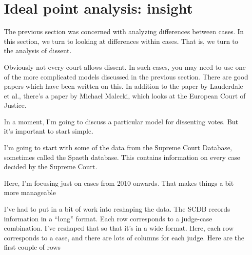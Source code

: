 \documentclass[12pt,twoside]{article}
\begin{document}
\section{Ideal point analysis:
insight}\label{ideal-point-analysis-insight}

The previous section was concerned with analyzing differences between
cases. In this section, we turn to looking at differences within cases.
That is, we turn to the analysis of dissent.

Obviously not every court allows dissent. In such cases, you may need to
use one of the more complicated models discussed in the previous
section. There are good papers which have been written on this. In
addition to the paper by Lauderdale et al., there's a paper by Michael
Malecki, which looks at the European Court of Justice.

In a moment, I'm going to discuss a particular model for dissenting
votes. But it's important to start simple.

I'm going to start with some of the data from the Supreme Court
Database, sometimes called the Spaeth database. This contains
information on every case decided by the Supreme Court.

Here, I'm focusing just on cases from 2010 onwards. That makes things a
bit more manageable

I've had to put in a bit of work into reshaping the data. The SCDB
records information in a ``long'' format. Each row corresponds to a
judge-case combination. I've reshaped that so that it's in a wide
format. Here, each row corresponds to a case, and there are lots of
columns for each judge. Here are the first couple of rows
\end{document}
